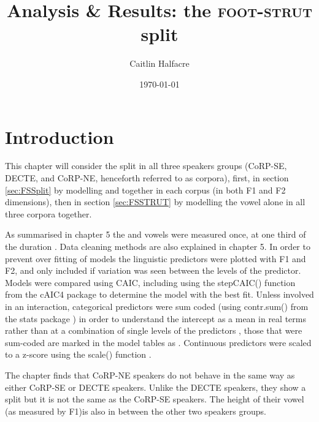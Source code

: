 \documentclass[../../../00.FullDoc/tex/ThesisSkeleton-draft2]{subfiles}
\title{Analysis \& Results: the \textsc{foot}-\textsc{strut} split}
\author{Caitlin Halfacre}
\date{\today}
\begin{document}
	\newcommand{\onlyinsubfile}[1]{#1}
	\newcommand{\notinsubfile}[1]{}
		\maketitle
		\pagebreak
		\tableofcontents
		\onehalfspacing
	\pagestyle{scrheadings}
	
\section{Introduction} \label{sec:FSintro}

This chapter will consider the \FS{} split in all three speakers groups (CoRP-SE, DECTE, and CoRP-NE, henceforth referred to as corpora), first, in section \ref{sec:FSSplit} by modelling \foot{} and \strutt{} together in each corpus (in both F1 and F2 dimensions), then in section \ref{sec:FSSTRUT} by modelling the \strutt{} vowel alone in all three corpora together.

As summarised in chapter \onlyinsubfile{5}\notinsubfile{\ref{ch:Methodology}} the \foot{} and \strutt{} vowels were measured once, at one third of the duration \citep{FAVE}. Data cleaning methods are also explained in chapter \onlyinsubfile{5}\notinsubfile{\ref{ch:Methodology}}.
In order to prevent over fitting of models the linguistic predictors were plotted with F1 and F2, and only included if variation was seen between the levels of the predictor. Models were compared using CAIC, including using the stepCAIC() function from the cAIC4 package \citep{cAIC4} to determine the model with the best fit. Unless involved in an interaction, categorical predictors were sum coded (using contr.sum() from the stats package \citealt{RCoreTeam2021}) in order to understand the intercept as a mean in real terms rather than at a combination of single levels of the predictors \cite{Winter2019}, those that were sum-coded are marked in the model tables as . Continuous predictors were scaled to a z-score using the scale() function \citep{RCoreTeam2021}.

The chapter finds that CoRP-NE speakers do not behave in the same way as either CoRP-SE or DECTE speakers. Unlike the DECTE speakers, they show a split but it is not the same as the CoRP-SE speakers. The height of their \strutt{} vowel (as measured by F1)is also in between the other two speakers groups.
 
\end{document}
